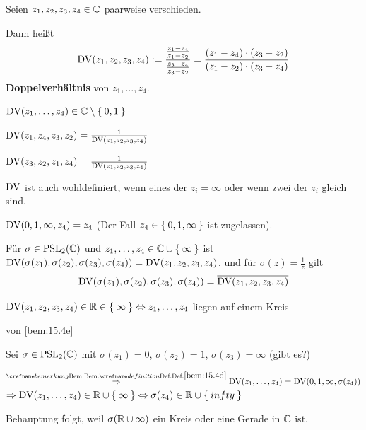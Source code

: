 \begin{definition}%
    Seien $z_1, z_2, z_3, z_4 \in \mathbb{C}$ paarweise verschieden.

    Dann heißt 
    \[\operatorname{DV}(z_1, z_2, z_3, z_4) := \frac{\frac{z_1 - z_4}{z_1 - z_2}}{\frac{z_3 - z_4}{z_3 - z_2}} = \frac{(z_1 - z_4) \cdot (z_3 - z_2)}{(z_1 - z_2) \cdot (z_3 - z_4)}\]
    \textbf{Doppelverhältnis} von 
    $z_1, \dots, z_4$.
\end{definition}

\begin{bemerkung}
    \begin{bemenum}
        \item $\operatorname{DV}(z_1, \dots, z_4) \in \mathbb{C} \setminus \Set{0,1}$
        \item \label{bem:15.4b.ii} $\operatorname{DV}(z_1, z_4, z_3, z_2) = \frac{1}{\operatorname{DV}(z_1, z_2, z_3, z_4)}$
        \item $\operatorname{DV}(z_3, z_2, z_1, z_4) = \frac{1}{\operatorname{DV}(z_1, z_2, z_3, z_4)}$
        \item $\operatorname{DV}$ ist auch wohldefiniert, wenn eines der $z_i = \infty$
              oder wenn zwei der $z_i$ gleich sind.
        \item $\operatorname{DV}(0, 1, \infty, z_4) = z_4$ (Der Fall $z_4 \in \Set{0, 1, \infty}$ ist zugelassen).
        \item \label{bem:15.4d} Für $\sigma \in \mathrm{PSL}_2(\mathbb{C})$ und $z_1, \dots, z_4 \in \mathbb{C} \cup \Set{\infty}$
              ist $\operatorname{DV}(\sigma(z_1), \sigma(z_2), \sigma(z_3), \sigma(z_4)) = \operatorname{DV}(z_1, z_2, z_3, z_4)$.
              und für $\sigma(z) = \frac{1}{\overline{z}}$ gilt
              \[\operatorname{DV}(\sigma(z_1), \sigma(z_2), \sigma(z_3), \sigma(z_4)) = \overline{\operatorname{DV}(z_1, z_2, z_3, z_4)}\]
        \item \label{bem:15.4e} $\operatorname{DV}(z_1, z_2, z_3, z_4) \in \mathbb{R} \in \Set{\infty} \Leftrightarrow z_1, \dots, z_4$
              liegen auf einem Kreis
    \end{bemenum}
\end{bemerkung}

\begin{beweis}
    von \cref{bem:15.4e}

    Sei $\sigma \in \mathrm{PSL}_2(\mathbb{C})$ mit $\sigma(z_1) = 0$, $\sigma(z_2) = 1$,
    $\sigma(z_3) = \infty$ (gibt es?)

    $\overset{\crefabbr{bem:15.4d}}{\Rightarrow} \DV(z_1, \dots, z_4) = \DV(0, 1, \infty, \sigma(z_4))$\\
    $\Rightarrow \operatorname{DV}(z_1, \dots, z_4) \in \mathbb{R} \cup \Set{\infty} \Leftrightarrow \sigma(z_4) \in \mathbb{R} \cup \Set{infty}$

    Behauptung folgt, weil $\sigma(\mathbb{R} \cup \infty)$ ein Kreis oder
    eine Gerade in $\mathbb{C}$ ist.
\end{beweis}

